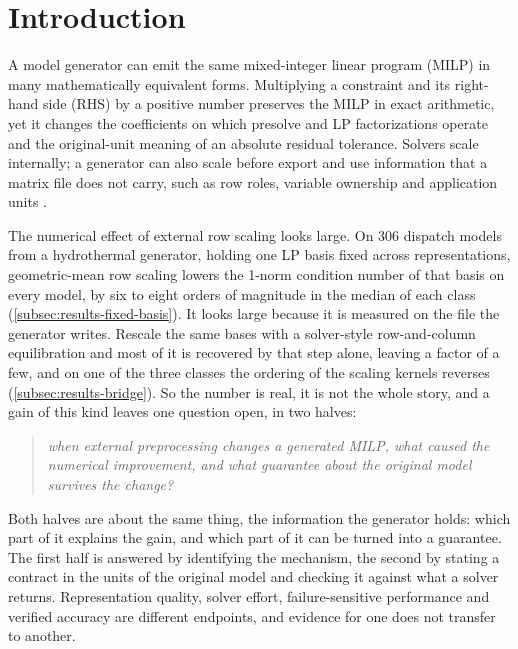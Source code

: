 \documentclass[smallextended,envcountsect,envcountsame]{svjour3}
\begin{document}
\section{Introduction}
A model generator can emit the same mixed-integer linear program (MILP) in many mathematically
equivalent forms. Multiplying a constraint and its right-hand side (RHS) by a positive number
preserves the MILP in exact arithmetic, yet it changes the coefficients on which
presolve and LP factorizations operate and the original-unit meaning of an absolute residual
tolerance. Solvers scale internally; a generator can also scale before export and use
information that a matrix file does not carry, such as row roles, variable ownership and
application units \cite{gurobiExternalScaling,idaesScaling}.

The numerical effect of external row scaling looks large. On 306 dispatch models from a
hydrothermal generator, holding one LP basis fixed across representations, geometric-mean
row scaling lowers the 1-norm condition number of that basis on every model, by six to eight
orders of magnitude in the median of each class (\cref{subsec:results-fixed-basis}). It looks
large because it is measured on the file the generator writes. Rescale the same bases with a
solver-style row-and-column equilibration and most of it is recovered by that step alone,
leaving a factor of a few, and on one of the three classes the ordering of the scaling kernels
reverses
(\cref{subsec:results-bridge}). So the number is real, it is not the whole story, and a gain of
this kind leaves one question open, in two halves:
\begin{quote}
\emph{when external preprocessing changes a generated MILP, what caused the numerical
improvement, and what guarantee about the original model survives the change?}
\end{quote}
Both halves are about the same thing, the information the generator holds: which part of it
explains the gain, and which part of it can be turned into a guarantee. The first half is
answered by identifying the mechanism, the second by stating a contract in the units of the
original model and checking it against what a solver returns. Representation quality, solver
effort, failure-sensitive performance and verified accuracy are different endpoints, and
evidence for one does not transfer to another.
\end{document}
